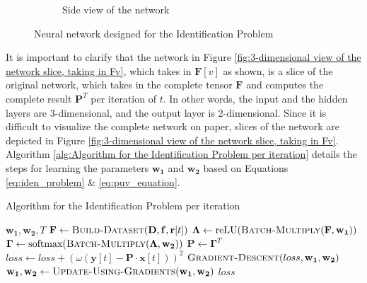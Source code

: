 \documentclass[12pt]{article}
\newcommand{\matr}[1]{\mathbf{#1}}  %
\begin{document}
\begin{figure}[H]
\begin{subfigure}{.35\textwidth}
            \caption{Side view of the network}
            \label{fig:Side view of the network}
        \end{subfigure}
        \caption{Neural network designed for the Identification Problem}
        \label{fig:Neural network designed for the Identification Problem}
    \end{figure}
    It is important to clarify that the network in Figure \ref{fig:3-dimensional view of the network slice, taking in Fv}, which takes in $\matr{F}[v]$ as shown, is a slice of the original network, which takes in the complete tensor $\matr{F}$ and computes the complete result $\matr{P}^{T}$  per iteration of $t$. In other words, the input and the hidden layers are 3-dimensional, and the output layer is 2-dimensional. Since it is difficult to visualize the complete network on paper, slices of the network are depicted in Figure \ref{fig:3-dimensional view of the network slice, taking in Fv}. Algorithm \ref{alg:Algorithm for the Identification Problem per iteration} details the steps for learning the parameters $\matr{w_1}$ and $\matr{w_2}$ based on Equations \ref{eq:iden_problem} \& \ref{eq:puv_equation}.
    \begin{algorithm}
        \caption{Algorithm for the Identification Problem per iteration} \label{alg:Algorithm for the Identification Problem per iteration}
        \begin{algorithmic}[1]
            \Require $\matr{w_1}, \matr{w_2}, T$
            \Function{Identify-Weights}{$\matr{x}, \matr{y}, \matr{r}, \matr{D}, \matr{f}, \omega$}
                \State $\matr{F} \gets \Call{Build-Dataset}{\matr{D}, \matr{f}, \matr{r}[t]}$
                \State $\matr{\Lambda} \gets \text{reLU}(\Call{Batch-Multiply}{\matr{F}, \matr{w_1}})$
                \State $\matr{\Gamma} \gets \text{softmax}(\Call{Batch-Multiply}{\matr{\Lambda}, \matr{w_2}})$
                \State $\matr{P} \gets \matr{\Gamma}^T$
                \State $loss \gets loss + (\omega(\matr{y}[t] - \matr{P} \cdot \matr{x}[t]))^2$
            \EndFor
            \State $\Call{Gradient-Descent}{loss, \matr{w_1}, \matr{w_2}}$
            \State $\matr{w_1}, \matr{w_2} \gets \Call{Update-Using-Gradients}{\matr{w_1}, \matr{w_2}}$
            \State \Return $loss$
            \EndFunction
        \end{algorithmic}
    \end{algorithm}
\end{document}
